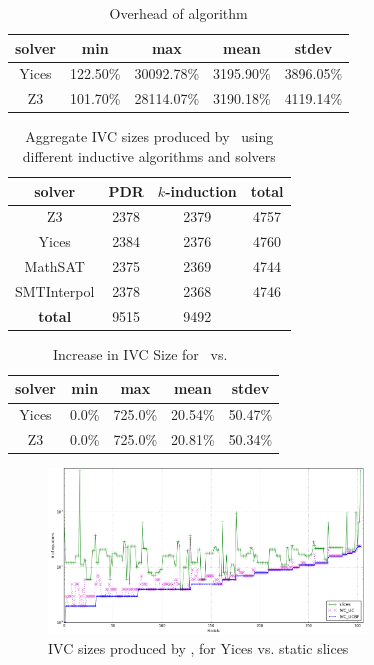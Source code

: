 \begin{table}
  \centering
  \begin{tabular}{ |c||c|c|c|c| }
    \hline
     solver & min & max & mean & stdev \\[0.5ex]
    \hline
    Yices & 122.50\%  & 30092.78\%   & 3195.90\% & 3896.05\% \\[0.5ex]
    \hline
    Z3 & 101.70\%  & 28114.07\%   & 3190.18\% & 4119.14\% \\[0.5ex]
    \hline
  \end{tabular}
  \caption{Overhead of \ucbfalg algorithm}
  \label{tab:overhead-ucbfalg}
\end{table}

\begin{table}
  \centering
  \begin{tabular}{ |c|c|c|c| }
    \hline
     solver & PDR & $k$-induction & \textbf{total} \\
    \hline
      Z3 & 2378 & 2379 & 4757 \\
      Yices & 2384 & 2376 & 4760 \\
      MathSAT & 2375 & 2369 & 4744 \\
      SMTInterpol & 2378 & 2368 & 4746 \\
    \hline
      \textbf{total} & 9515 & 9492 &   \\
    \hline
  \end{tabular}
  \caption{Aggregate IVC sizes produced by \ucalg\ using different inductive algorithms and solvers}
  \label{tab:minimality-algorithm-solvers}
\end{table}

\begin{table}
  \centering
  \begin{tabular}{ |c||c|c|c|c| }
    \hline
     solver & min & max & mean & stdev \\[0.5ex]
    \hline
    Yices &   0.0\%   & 725.0\% & 20.54\% & 50.47\% \\[0.5ex]
    Z3 &   0.0\%   & 725.0\% & 20.81\% & 50.34\% \\[0.5ex]
    \hline
  \end{tabular}
  \caption{Increase in IVC Size for \ucalg\ vs.\ \ucbfalg}
  \label{tab:increase-ucalg-ucbfalg}
\end{table}


\begin{figure}
  \centering
  \includegraphics[width=0.75\textwidth]{figs/minimality.png}
  \caption{IVC sizes produced by \ucalg, \ucbfalg for Yices vs. static slices}
  \vspace{-0.1in}
  \label{fig:minimality-all}
\end{figure}

